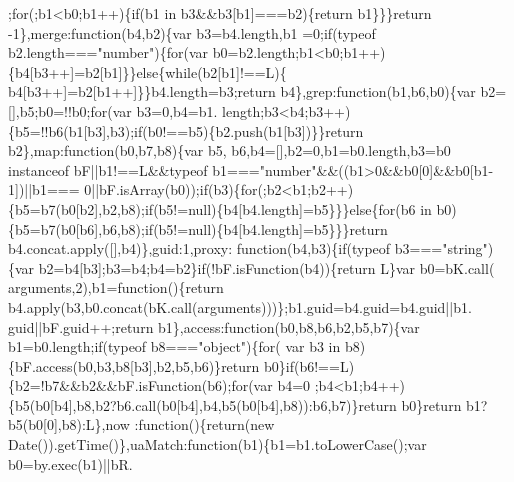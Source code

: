 \begin{DoxyCode}
      ;\textcolor{keywordflow}{for}(;b1<b0;b1++)\{\textcolor{keywordflow}{if}(b1 in b3&&b3[b1]===b2)\{\textcolor{keywordflow}{return} b1\}\}\}\textcolor{keywordflow}{return} -1\},merge:\textcolor{keyword}{function}(b4,b2)\{var b3=b4.length,b1
      =0;\textcolor{keywordflow}{if}(typeof b2.length===\textcolor{stringliteral}{"number"})\{\textcolor{keywordflow}{for}(var b0=b2.length;b1<b0;b1++)\{b4[b3++]=b2[b1]\}\}\textcolor{keywordflow}{else}\{\textcolor{keywordflow}{while}(b2[b1]!==L)\{
      b4[b3++]=b2[b1++]\}\}b4.length=b3;\textcolor{keywordflow}{return} b4\},grep:\textcolor{keyword}{function}(b1,b6,b0)\{var b2=[],b5;b0=!!b0;\textcolor{keywordflow}{for}(var b3=0,b4=b1.
      length;b3<b4;b3++)\{b5=!!b6(b1[b3],b3);\textcolor{keywordflow}{if}(b0!==b5)\{b2.push(b1[b3])\}\}\textcolor{keywordflow}{return} b2\},map:\textcolor{keyword}{function}(b0,b7,b8)\{var b5,
      b6,b4=[],b2=0,b1=b0.length,b3=b0 instanceof bF||b1!==L&&typeof b1===\textcolor{stringliteral}{"number"}&&((b1>0&&b0[0]&&b0[b1-1])||b1===
      0||bF.isArray(b0));\textcolor{keywordflow}{if}(b3)\{\textcolor{keywordflow}{for}(;b2<b1;b2++)\{b5=b7(b0[b2],b2,b8);\textcolor{keywordflow}{if}(b5!=null)\{b4[b4.length]=b5\}\}\}\textcolor{keywordflow}{else}\{\textcolor{keywordflow}{for}(b6 
      in b0)\{b5=b7(b0[b6],b6,b8);\textcolor{keywordflow}{if}(b5!=null)\{b4[b4.length]=b5\}\}\}\textcolor{keywordflow}{return} b4.concat.apply([],b4)\},guid:1,proxy:\textcolor{keyword}{
      function}(b4,b3)\{\textcolor{keywordflow}{if}(typeof b3===\textcolor{stringliteral}{"string"})\{var b2=b4[b3];b3=b4;b4=b2\}\textcolor{keywordflow}{if}(!bF.isFunction(b4))\{\textcolor{keywordflow}{return} L\}var b0=bK.call(
      arguments,2),b1=\textcolor{keyword}{function}()\{\textcolor{keywordflow}{return} b4.apply(b3,b0.concat(bK.call(arguments)))\};b1.guid=b4.guid=b4.guid||b1.
      guid||bF.guid++;\textcolor{keywordflow}{return} b1\},access:\textcolor{keyword}{function}(b0,b8,b6,b2,b5,b7)\{var b1=b0.length;\textcolor{keywordflow}{if}(typeof b8===\textcolor{stringliteral}{"object"})\{\textcolor{keywordflow}{for}(
      var b3 in b8)\{bF.access(b0,b3,b8[b3],b2,b5,b6)\}\textcolor{keywordflow}{return} b0\}\textcolor{keywordflow}{if}(b6!==L)\{b2=!b7&&b2&&bF.isFunction(b6);\textcolor{keywordflow}{for}(var b4=0
      ;b4<b1;b4++)\{b5(b0[b4],b8,b2?b6.call(b0[b4],b4,b5(b0[b4],b8)):b6,b7)\}\textcolor{keywordflow}{return} b0\}\textcolor{keywordflow}{return} b1?b5(b0[0],b8):L\},now
      :function()\{\textcolor{keywordflow}{return}(\textcolor{keyword}{new} Date()).getTime()\},uaMatch:\textcolor{keyword}{function}(b1)\{b1=b1.toLowerCase();var b0=by.exec(b1)||bR.

\end{DoxyCode}

